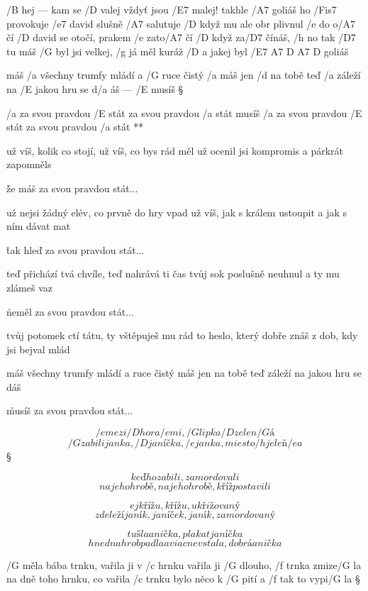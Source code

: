 /B hej --- kam se /D valej vždyť jsou /E7 malej!
takhle /A7 goliáš ho /Fis7 provokuje
/e7 david slušně /A7 salutuje
/D když mu ale obr plivnul /e do o/A7 čí
/D david se otočí, prakem /e zato/A7 čí
/D když za/D7 čínáš, /h no tak /D7 tu máš
/G byl jsi velkej, /g já měl kuráž %
/D a jakej byl /{E7 A7 D A7 D} goliáš




máš /a všechny trumfy mládí a /G ruce čistý /a máš
jen /d na tobě teď /a záleží na /E jakou hru se d/a áš --- /E musíš \S

\R /a za svou pravdou /E stát
   za svou pravdou /a stát
   musíš /a za svou pravdou /E stát
   za svou pravdou /a stát **

už víš, kolik co stojí, už víš, co bys rád měl
už ocenil jsi kompromis a párkrát zapomněls \s

\r že máš za svou pravdou stát...

už nejsi žádný elév, co prvně do hry vpad
už víš, jak s králem ustoupit a jak s ním dávat mat \s

\r tak hleď za svou pravdou stát...

teď přichází tvá chvíle, teď nahrává ti čas
tvůj  sok poslušně neuhnul a ty  mu zlámeš vaz \s

\r neměl za svou pravdou stát...

tvůj potomek ctí tátu, ty vštěpuješ mu rád
to heslo, který dobře znáš z dob, kdy jsi bejval mlád \s

máš všechny trumfy mládí a ruce čistý máš
jen na tobě teď záleží na jakou hru se dáš \s

\r musíš za svou pravdou stát...




\[ /e mezi /D hora/e mi, /G lipka /D zelen/G á \]
\[ /G zabili janka, /D janíčka, /e janka, miesto /h jeleň/e a \] \S

\[ keď ho zabili, zamordovali \]
\[ na jeho hrobě, na jeho hrobě, kříž postavili \] \s

\[ ej křížu, křížu, ukřižovaný \]
\[ zde leží janík, janíček, janík, zamordovaný \] \s


\[ tu šla anička, plakat janíčka \]
\[ hned na hrob padla a viac nevstala, dobrá anička \]



/G měla bába trnku, vařila ji v /c hrnku
vařila ji /G dlouho, /f trnka zmize/G la
na dně toho hrnku, co vařila /c trnku
bylo něco k /G pití a /f tak to vypi/G la \S

